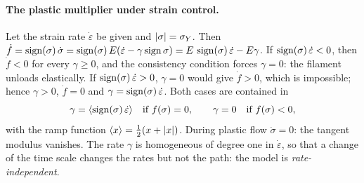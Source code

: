 \paragraph{The plastic multiplier under strain control.} Let the strain rate
$\dot\varepsilon$ be given and $|\sigma|=\sigma_{Y}$. Then
$\dot f=\operatorname{sign}(\sigma)\,\dot\sigma=\operatorname{sign}(\sigma)\,E(\dot\varepsilon-\gamma\operatorname{sign}\sigma)
=E\,\operatorname{sign}(\sigma)\,\dot\varepsilon-E\gamma$. If $\operatorname{sign}(\sigma)\,\dot\varepsilon<0$,
then $\dot f<0$ for every $\gamma\ge0$, and the consistency condition forces
$\gamma=0$: the filament unloads elastically. If $\operatorname{sign}(\sigma)\,\dot\varepsilon>0$,
$\gamma=0$ would give $\dot f>0$, which is impossible; hence $\gamma>0$,
$\dot f=0$ and $\gamma=\operatorname{sign}(\sigma)\,\dot\varepsilon$. Both cases are
contained in
\begin{equation}\label{eq:pl-1d-gamma-perfect}
  \gamma=\langle \operatorname{sign}(\sigma)\,\dot\varepsilon\rangle\quad\text{if } f(\sigma)=0,\qquad
  \gamma=0\quad\text{if } f(\sigma)<0,
\end{equation}
with the ramp function $\langle x\rangle=\tfrac12(x+|x|)$. During plastic flow
$\dot\sigma=0$: the tangent modulus vanishes. The rate $\gamma$ is
homogeneous of degree one in $\dot\varepsilon$, so that a change of the time
scale changes the rates but not the path: the model is
\emph{rate-independent}.

